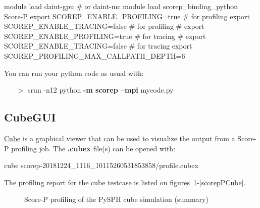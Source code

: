 \documentclass[a4paper,pagesize,12pt]{scrbook}
\begin{document}
\begin{python}
    module load daint-gpu # or daint-mc
    module load scorep_binding_python Score-P
    export SCOREP_ENABLE_PROFILING=true          # for profiling
    export SCOREP_ENABLE_TRACING=false           # for profiling
#   export SCOREP_ENABLE_PROFILING=true          # for tracing
#   export SCOREP_ENABLE_TRACING=false           # for tracing
    export SCOREP_PROFILING_MAX_CALLPATH_DEPTH=6
\end{python}

You can run your python code as usual with:
\begin{itemize}
    \item[$>$] srun -n12 python \textbf{-m scorep --mpi} mycode.py
\end{itemize}

\subsection{CubeGUI}
\href{http://apps.fz-juelich.de/scalasca/releases/cube/4.4/docs/guide/html/}{Cube}
is a graphical viewer that can be used to visualize the output from a Score-P
profiling job. The \textbf{.cubex} file(s) can be opened with:
\begin{python}
    cube scorep-20181224_1116_10115260531853858/profile.cubex
\end{python}

The profiling report for the cube testcase is listed on
figures~\ref{scorepP}-\ref{scorepPCube}.

\begin{figure}[!ht]
\captionsetup[subfigure]{labelformat=empty}
\caption{Score-P profiling of the PySPH cube simulation (summary)}
\label{scorepP}
  \hfill
\end{figure}%
\vspace{-1cm}
\begin{figure}[!ht]
\captionsetup{labelformat=empty}
\captionsetup[subfigure]{labelformat=empty}
  \hfill
\end{figure}
\end{document}
